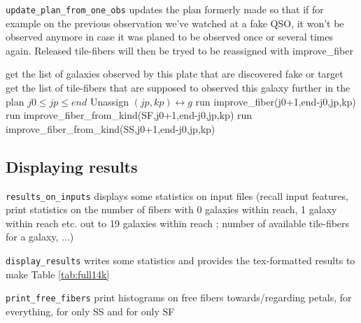 \documentclass{extarticle}
\begin{document}
{\tt update\_plan\_from\_one\_obs} updates the plan formerly made so that if for example on the previous observation we've watched at a fake QSO, it won't be observed anymore in case it was planed to be observed once or several times again. Released tile-fibers will then be tryed to be reassigned with improve\_fiber

\begin{algorithm}[H]
	\caption{Update\_plan\_from\_one\_observation(j0,end\_plan)}\label{euclid}
	\begin{algorithmic}[1]
		\State get the list of galaxies observed by this plate that are discovered fake or target
		\State get the list of tile-fibers that are supposed to observed this galaxy further in the plan $j0\le jp \le end$
		\State Unassign $(jp,kp) \longleftrightarrow g$
		\State run improve\_fiber(j0+1,end-j0,jp,kp)
		\State run improve\_fiber\_from\_kind(SF,j0+1,end-j0,jp,kp)
		\EndIf
		\State run improve\_fiber\_from\_kind(SS,j0+1,end-j0,jp,kp)
		\EndIf
		\EndFor
		\EndFor
	\end{algorithmic}
\end{algorithm}


\subsection{Displaying results}
{\tt results\_on\_inputs} displays some statistics on input files (recall input features, print statistics on the number of fibers with 0 galaxies within reach, 1 galaxy within reach etc. out to 19 galaxies within reach ; number of available tile-fibers for a galaxy, ...)

{\tt display\_results} writes some statistics and provides the tex-formatted results to make Table \ref{tab:full14k}

{\tt print\_free\_fibers} print histograms on free fibers towards/regarding petals, for everything, for only SS and for only SF
\end{document}
